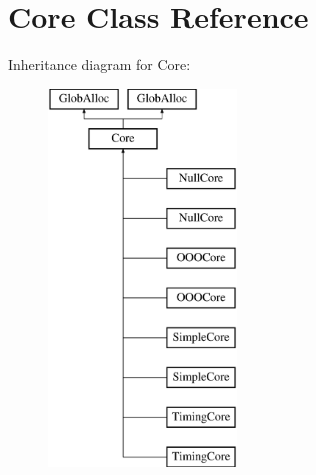 \hypertarget{classCore}{\section{Core Class Reference}
\label{classCore}
}
Inheritance diagram for Core\-:\begin{figure}[H]
\begin{center}
\leavevmode
\includegraphics[height=10.000000cm]{classCore}
\end{center}
\end{figure}
